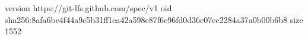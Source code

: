 version https://git-lfs.github.com/spec/v1
oid sha256:8afa6be4f44a9c5b31ff1ea42a598e87f6c96fd0d36c07ec2284a37a0b00b6b8
size 1552
